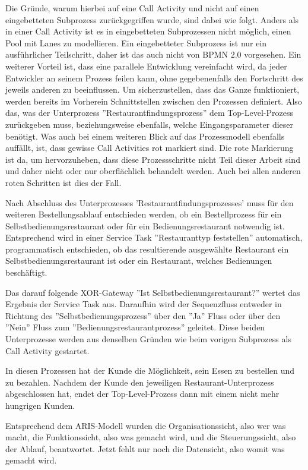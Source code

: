 Die Gründe, warum hierbei auf eine Call Activity und nicht auf einen eingebetteten Subprozess zurückgegriffen wurde, sind dabei wie folgt. Anders als in einer Call Activity ist es in eingebetteten Subprozessen nicht möglich, einen Pool mit Lanes zu modellieren. Ein eingebetteter Subprozess ist nur ein ausführlicher Teilschritt, daher ist das auch nicht von \ac{BPMN} 2.0 vorgesehen. Ein weiterer Vorteil ist, dass eine parallele Entwicklung vereinfacht wird, da jeder Entwickler an seinem Prozess feilen kann, ohne gegebenenfalls den Fortschritt des jeweils anderen zu beeinflussen. Um sicherzustellen, dass das Ganze funktioniert, werden bereits im Vorherein Schnittstellen zwischen den Prozessen definiert. Also das, was der Unterprozess ''Restaurantfindungsprozess'' dem Top-Level-Prozess zurückgeben muss, beziehungsweise ebenfalls, welche Eingangsparameter dieser benötigt. Was auch bei einem weiteren Blick auf das Prozessmodell ebenfalls auffällt, ist, dass gewisse Call Activities rot markiert sind. Die rote Markierung ist da, um hervorzuheben, dass diese Prozessschritte nicht Teil dieser Arbeit sind und daher nicht oder nur oberflächlich behandelt werden. Auch bei allen anderen roten Schritten ist dies der Fall.

Nach Abschluss des Unterprozesses 'Restaurantfindungsprozesses' muss für den weiteren Bestellungsablauf entschieden werden, ob ein Bestellprozess für ein Selbstbedienungsrestaurant oder für ein Bedienungsrestaurant notwendig ist. Entsprechend wird in einer Service Task ''Restauranttyp feststellen'' automatisch, programmatisch entschieden, ob das resultierende ausgewählte Restaurant ein Selbstbedienungsrestaurant ist oder ein Restaurant, welches Bedienungen beschäftigt. 

Das darauf folgende XOR-Gateway ''Ist Selbstbedienungsrestaurant?'' wertet das Ergebnis der Service Task aus. Daraufhin wird der Sequenzfluss entweder in Richtung des ''Selbstbedienungsprozess'' über den ''Ja'' Fluss oder über den ''Nein'' Fluss zum ''Bedienungsrestaurantprozess'' geleitet. Diese beiden Unterprozesse werden aus denselben Gründen wie beim vorigen Subprozess als Call Activity gestartet.

In diesen Prozessen hat der Kunde die Möglichkeit, sein Essen zu bestellen und zu bezahlen. Nachdem der Kunde den jeweiligen Restaurant-Unterprozess abgeschlossen hat, endet der Top-Level-Prozess dann mit einem nicht mehr hungrigen Kunden.

Entsprechend dem ARIS-Modell wurden die Organisationssicht, also wer was macht, die Funktionssicht, also was gemacht wird, und die Steuerungssicht, also der Ablauf, beantwortet. Jetzt fehlt nur noch die Datensicht, also womit was gemacht wird. \citep[vgl.][]{lackes_aris_2025}


